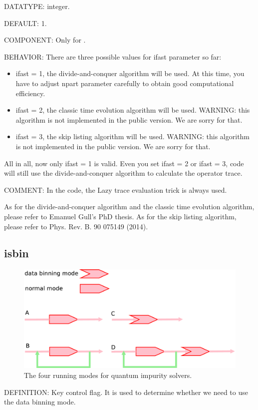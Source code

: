 {\color{green}DATATYPE:} integer.

{\color{blue}DEFAULT:} 1.

{\color{brown}COMPONENT:} Only for {\manjushaka}.

{\color{purple}BEHAVIOR:} There are three possible values for ifast parameter so far:
\begin{itemize}
\item ifast = 1, the divide-and-conquer algorithm will be used. At this time, you have to adjust npart parameter carefully to obtain good computational efficiency.
\item ifast = 2, the classic time evolution algorithm will be used. WARNING: this algorithm is not implemented in the public version. We are sorry for that.
\item ifast = 3, the skip listing algorithm will be used. WARNING: this algorithm is not implemented in the public version. We are sorry for that.
\end{itemize}

All in all, now only ifast = 1 is valid. Even you set ifast = 2 or ifast = 3, {\manjushaka} code will still use the divide-and-conquer algorithm to calculate the operator trace.

{\color{olive}COMMENT:} In the {\manjushaka} code, the Lazy trace evaluation trick is always used.

As for the divide-and-conquer algorithm and the classic time evolution algorithm, please refer to Emanuel Gull's PhD thesis. As for the skip listing algorithm, please refer to Phys. Rev. B. 90 075149 (2014).

\subsection{isbin}
\begin{figure}
\centering
\includegraphics[scale=0.20]{figure/flow.eps}
\caption{The four running modes for quantum impurity solvers.\label{fig:flow}}
\end{figure}
{\color{red}DEFINITION:} Key control flag. It is used to determine whether we need to use the data binning mode.

